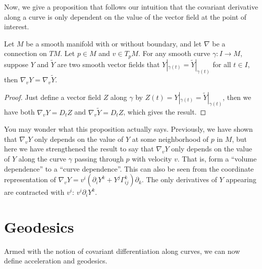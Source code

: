 \documentclass[../main.tex]{subfiles}
\begin{document}
Now, we give a proposition that follows our intuition that the covariant derivative along a curve is only dependent on the value of the vector field at the point of interest.

\begin{proposition}{}{}
	Let $M$ be a smooth manifold with or without boundary, and let $\nabla$ be a connection on $TM$. Let $p \in M$ and $v \in T_pM$. For any smooth curve $\gamma: I \to M$, suppose $Y$ and $\tilde{Y}$ are two smooth vector fields that $Y|_{\gamma(t)} = \tilde{Y}|_{\gamma(t)}$ for all $t \in I$, then $\nabla_v Y = \nabla_v \tilde{Y}$.
\end{proposition}
\begin{proof}
	Just define a vector field $Z$ along $\gamma$ by $Z(t) = Y|_{\gamma(t)} = \tilde{Y}|_{\gamma(t)}$, then we have both $\nabla_v Y = D_t Z$ and $\nabla_v \tilde{Y} = D_t Z$, which gives the result.
\end{proof}
\begin{remark}
	You may wonder what this proposition actually says. Previously, we have shown that $\nabla_v Y$ only depends on the value of $Y$ at some neighborhood of $p$ in $M$, but here we have strengthened the result to say that $\nabla_v Y$ only depends on the value of $Y$ along the curve $\gamma$ passing through $p$ with velocity $v$. That is, form a ``volume dependence'' to a ``curve dependence''. This can also be seen from the coordinate representation of $\nabla_v Y = v^i (\partial_i Y^k + Y^j \Gamma_{ij}^k) \partial_k$. The only derivatives of $Y$ appearing are contracted with $v^i$: $v^i \partial_i Y^k$.
\end{remark}

\section{Geodesics}
Armed with the notion of covariant differentiation along curves, we can now define acceleration and geodesics.
\end{document}
